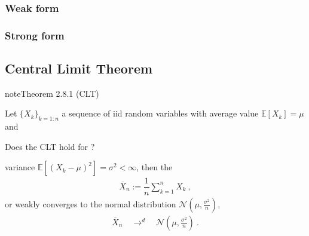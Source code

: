 \documentclass[letterpaper,10pt,english]{jupyterBook}
\begin{document}
\subsubsection{Weak form}
\label{\detokenize{ch/prob/iid:weak-form}}\label{\detokenize{ch/prob/iid:prob-iid-large-numbers-weak}}
\sphinxAtStartPar
{}


\subsubsection{Strong form}
\label{\detokenize{ch/prob/iid:strong-form}}\label{\detokenize{ch/prob/iid:prob-iid-large-numbers-strong}}
\sphinxAtStartPar
{}


\subsection{Central Limit Theorem}
\label{\detokenize{ch/prob/iid:central-limit-theorem}}\label{\detokenize{ch/prob/iid:prob-iid-clt}}\label{ch/prob/iid:thm:clt}
\begin{sphinxadmonition}{note}{Theorem 2.8.1 (CLT)}



\sphinxAtStartPar
Let \(\{ X_k \}_{k=1:n}\) a sequence of iid random variables with average value \(\mathbb{E}[X_k] = \mu\) and %
\begin{footnote}[1]\sphinxAtStartFootnote
Does the CLT hold for {\hyperref[\detokenize{ch/prob/heavy-tailed:prob-heavy-tailed}]{}}?
%
\end{footnote} variance \(\mathbb{E}[(X_k-\mu)^2] = \sigma^2 < \infty\), then the 
\begin{equation*}
\begin{split}\overline{X}_n := \dfrac{1}{n} \sum_{k=1}^n X_k \ ,\end{split}
\end{equation*}
\sphinxAtStartPar
{\hyperref[\detokenize{ch/prob/convergence:prob-convergence-weak}]{}} \sphinxhyphen{} or weakly converges \sphinxhyphen{} to the normal distribution \(\mathscr{N}\left(\mu, \frac{\sigma^2}{n} \right)\),
\begin{equation*}
\begin{split}\overline{X}_n \quad \rightarrow^d \quad \mathscr{N}\left(\mu, \frac{\sigma^2}{n} \right) \ .\end{split}
\end{equation*}\end{sphinxadmonition}
\end{document}
